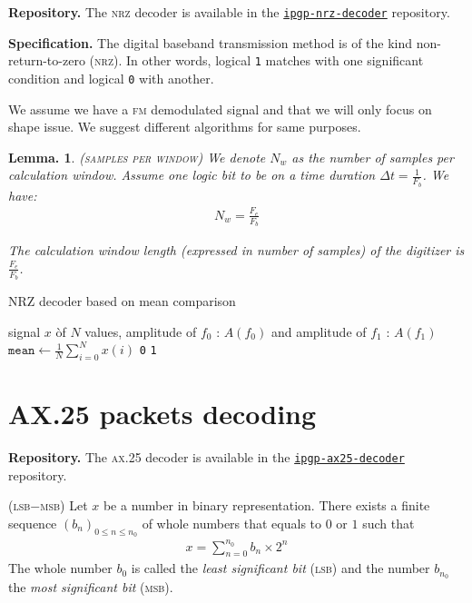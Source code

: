 \documentclass[a4paper]{report}
\newtheorem{proposition}[theorem]{Lemma.}
\newenvironment{definition}[1][Definition.]{\begin{trivlist}
\item[\hskip \labelsep {\bfseries #1}]}{\end{trivlist}}
\begin{document}
\noindent
\textbf{Repository.} The \textsc{nrz} decoder is available in the \href{https://github.com/EmptyStackExn/ipgp-nrz-decoder}{\texttt{ipgp-nrz-decoder}} repository.

\noindent
\textbf{Specification.}
  The digital baseband transmission method is of the kind non-return-to-zero (\textsc{nrz}). In other words, logical \texttt{1} matches with one significant condition and logical \texttt{0} with another.

We assume we have a \textsc{fm} demodulated signal and that we will only focus on shape issue. We suggest different algorithms for same purposes.

\begin{proposition}
  \textsc{(samples per window)}
  We denote $N_w$ as the number of samples per calculation window. Assume one logic bit to be on a time duration $\Delta t = \frac{1}{F_b}$. We have:
  \begin{eqnarray}
    N_w = \frac{F_e}{F_b}
  \end{eqnarray}

  The calculation window length (expressed in number of samples) of the digitizer is $\frac{F_e}{F_b}$.
\end{proposition}

\begin{algorithm}[h]
\caption{NRZ decoder based on mean comparison}
\label{algo_numerisation_FSK}
\begin{algorithmic}[1]
  \REQUIRE signal $x$ \`of $N$ values, amplitude of $f_0$ : $A(f_0)$ and amplitude of $f_1$ : $A(f_1)$
  \STATE $\texttt{mean} \leftarrow \frac{1}{N}\sum^N_{i = 0}{x(i)}$
  \RETURN \texttt{0}
  \ELSE
  \RETURN \texttt{1}
  \ENDIF
\end{algorithmic}
\end{algorithm}

\section{AX.25 packets decoding}

\textbf{Repository.} The \textsc{ax.25} decoder is available in the \href{https://github.com/EmptyStackExn/ipgp-ax25-decoder}{\texttt{ipgp-ax25-decoder}} repository.

\begin{definition}
  { \color{rltred}{\Radioactivity} }
  \textsc{(lsb$-$msb)}
  Let $x$ be a number in binary representation. There exists a finite sequence $\left ( b_n \right )_{0 \leq n \leq n_0}$ of whole numbers that equals to $0$ or $1$ such that 
  \begin{eqnarray*}
    x = \sum^{n_0}_{n = 0}{b_n \times 2^n}
  \end{eqnarray*}
  The whole number $b_0$ is called the \textit{least significant bit} (\textsc{lsb}) and the number $b_{n_0}$ the \textit{most significant bit} (\textsc{msb}).
\end{definition}
\end{document}
